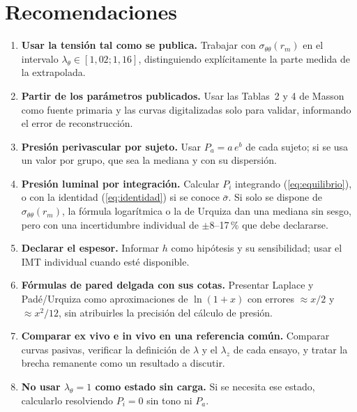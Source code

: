 \documentclass[11pt,a4paper]{article}
\newcommand{\stt}{\sigma_{\theta\theta}}
\newcommand{\lt}{\lambda_\theta}
\begin{document}
\section{Recomendaciones}
\begin{enumerate}
\item \textbf{Usar la tensión tal como se publica.} Trabajar con $\stt(r_m)$ en el intervalo $\lt\in[1{,}02;1{,}16]$, distinguiendo explícitamente la parte medida de la extrapolada.
\item \textbf{Partir de los parámetros publicados.} Usar las Tablas~2 y 4 de Masson como fuente primaria y las curvas digitalizadas solo para validar, informando el error de reconstrucción.
\item \textbf{Presión perivascular por sujeto.} Usar $P_a=a\,e^b$ de cada sujeto; si se usa un valor por grupo, que sea la mediana y con su dispersión.
\item \textbf{Presión luminal por integración.} Calcular $P_i$ integrando (\ref{eq:equilibrio}), o con la identidad (\ref{eq:identidad}) si se conoce $\bar\sigma$. Si solo se dispone de $\stt(r_m)$, la fórmula logarítmica o la de Urquiza dan una mediana sin sesgo, pero con una incertidumbre individual de $\pm$8--17\,\% que debe declararse.
\item \textbf{Declarar el espesor.} Informar $h$ como hipótesis y su sensibilidad; usar el IMT individual cuando esté disponible.
\item \textbf{Fórmulas de pared delgada con sus cotas.} Presentar Laplace y Padé/Urquiza como aproximaciones de $\ln(1+x)$ con errores $\approx x/2$ y $\approx x^2/12$, sin atribuirles la precisión del cálculo de presión.
\item \textbf{Comparar ex vivo e in vivo en una referencia común.} Comparar curvas pasivas, verificar la definición de $\lambda$ y el $\lambda_z$ de cada ensayo, y tratar la brecha remanente como un resultado a discutir.
\item \textbf{No usar $\lt=1$ como estado sin carga.} Si se necesita ese estado, calcularlo resolviendo $P_i=0$ sin tono ni $P_a$.
\end{enumerate}

\end{document}
